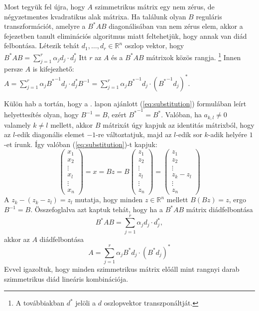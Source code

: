\documentclass[a4paper, showtrims]{memoir}
\theoremstyle{plain}
\theoremstyle{remark}
\theoremstyle{definition}
\begin{document}
Most tegyük fel újra, hogy $A$ szimmetrikus mátrix egy nem zérus, de négyzetmentes kvadratikus alak mátrixa.
Ha találunk olyan $B$ reguláris transzformációt, amelyre a $B^\ast AB$ diagonálisában van nem zérus elem,
akkor a fejezetben tanult eliminációs algoritmus miatt feltehetjük, hogy annak van diád felbontása.
Létezik tehát $d_1,\dots,d_r\in\mathbb{R}^n$ oszlop vektor, hogy 
\(
    B^\ast AB=\sum_{j=1}^r\alpha_jd_j\cdot d_j^\ast
\)
Itt $r$ az $A$ és a $B^\ast AB$ mátrixok közös rangja.%
\footnote{A továbbiakban $d^\ast$ jelöli a $d$ oszlopvektor transzponáltját.}
Innen persze $A$ is kifejezhető:
\(
    A=\sum_{j=1}^r\alpha_j{B^\ast}^{-1}d_j\cdot d_j^\ast B^{-1}
    =
    \sum_{j=1}^r\alpha_j{B^\ast}^{-1}d_j\cdot \left( {B^\ast}^{-1}d_j \right)^\ast.
\)


Külön hab a tortán, 
hogy a \pageref{eq:substitution}. lapon ajánlott (\ref{eq:substitution}) formulában leírt helyettesítés olyan, 
hogy $B^{-1}=B$, ezért ${B^\ast}^{-1}=B^\ast$.
Valóban, ha $a_{k,l}\neq 0$ valamely $k\neq l$ mellett,
akkor $B$ mátrixát úgy kapjuk az identitás mátrixból, hogy az $l$-edik diagonális elemet $-1$-re változtatjuk,
majd az $l$-edik sor $k$-adik helyére $1$-et írunk.
Így valóban (\ref{eq:substitution})-t kapjuk:
\[
    \begin{pmatrix}
        x_1\\x_2\\\vdots\\ x_l\\\vdots\\x_n
    \end{pmatrix}
    =
    x=Bz
    =B
    \begin{pmatrix}
        z_1\\z_2\\\vdots\\ z_l\\\vdots\\z_n
    \end{pmatrix}
    =
    \begin{pmatrix}
        z_1\\z_2\\\vdots\\ z_k-z_l\\\vdots\\z_n
    \end{pmatrix}
\]
A $z_k-\left( z_k-z_l \right)=z_l$ mutatja, hogy minden $z\in\mathbb{R}^n$ mellett $B(Bz)=z$, 
ergo $B^{-1}=B$.
Összefoglalva azt kaptuk tehát, hogy ha a $B^\ast AB$ mátrix diádfelbontása
\[
    B^\ast AB
    =
    \sum_{j=1}^r\alpha_jd_j\cdot d_j^\ast,
\]
akkor az $A$ diádfelbontása
\[
    A=
    \sum_{j=1}^r\alpha_jB^{\ast}d_j\cdot\left( B^\ast d_j \right)^\ast
\]
Evvel igazoltuk, hogy minden szimmetrikus mátrix előáll mint rangnyi darab szimmetrikus diád lineáris kombinációja.
\end{document}
